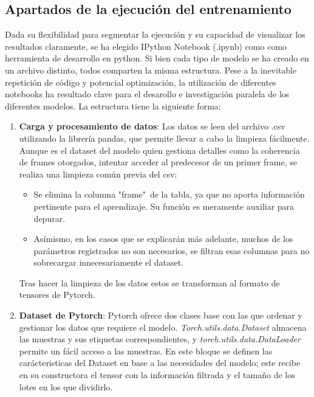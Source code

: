\subsection{Apartados de la ejecución del entrenamiento}

Dada su flexibilidad para segmentar la ejecución y su capacidad de visualizar los resultados claramente, se ha elegido IPython Notebook (.ipynb) como como herramienta de desarrollo en python. Si bien cada tipo de modelo se ha creado en un archivo distinto, todos comparten la misma estructura. Pese a la inevitable repetición de código y potencial optimización, la utilización de diferentes notebooks ha resultado clave para el desarollo e investigación paralela de los diferentes modelos. La estructura tiene la siguiente forma:

\begin{enumerate}

    \item \textbf{Carga y procesamiento de datos}: 
    Los datos se leen del archivo .csv utilizando la librería pandas, que permite llevar a cabo la limpieza fácilmente. Aunque es el dataset del modelo quien gestiona detalles como la coherencia de frames otorgados, intentar acceder al predecesor de un primer frame, se realiza una limpieza común previa del csv:
    \begin{itemize}
        \item Se elimina la columna "frame"\ de la tabla, ya que no aporta información pertinente para el aprendizaje. Su función es meramente auxiliar para depurar.
        \item Asímismo, en los casos que se explicarán más adelante, muchos de los parámetros registrados no son necesarios, se filtran esas columnas para no sobrecargar innecesariamente el dataset.
    \end{itemize}
    Tras hacer la limpieza de los datos estos se transforman al formato de tensores de Pytorch. 

    \item \textbf{Dataset de Pytorch}: Pytorch ofrece dos clases base con las que ordenar y gestionar los datos que requiere el modelo. \textit{Torch.utils.data.Dataset} almacena las muestras y sus etiquetas correspondientes, y \textit{torch.utils.data.DataLoader} permite un fácil acceso a las muestras. En este bloque se definen las carácteristicas del Dataset en base a las necesidades del modelo; este recibe en su constructora el tensor con la información filtrada y el tamaño de los lotes en los que dividirlo.


\end{enumerate}
